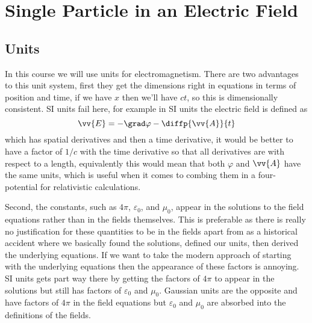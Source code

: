 \documentclass[fleqn]{NotesClass}
\begin{document}
    \chapter{Single Particle in an Electric Field}
    \section{Units}
    In this course we will use  units for electromagnetism.
    There are two advantages to this unit system, first they get the dimensions right in equations in terms of position and time, if we have \(x\) then we'll have \(ct\), so this is dimensionally consistent.
    SI units fail here, for example in SI units the electric field is defined as
    \begin{equation}
        \vv{E} = -\grad\varphi - \diffp{\vv{A}}{t}
    \end{equation}
    which has spatial derivatives and then a time derivative, it would be better to have a factor of \(1/c\) with the time derivative so that all derivatives are with respect to a length, equivalently this would mean that both \(\varphi\) and \(\vv{A}\) have the same units, which is useful when it comes to combing them in a four-potential for relativistic calculations.
    
    Second, the constants, such as \(4\pi\), \(\varepsilon_0\), and \(\mu_0\), appear in the solutions to the field equations rather than in the fields themselves.
    This is preferable as there is really no justification for these quantities to be in the fields apart from as a historical accident where we basically found the solutions, defined our units, then derived the underlying equations.
    If we want to take the modern approach of starting with the underlying equations then the appearance of these factors is annoying.
    SI units gets part way there by getting the factors of \(4\pi\) to appear in the solutions but still has factors of \(\varepsilon_0\) and \(\mu_0\).
    Gaussian units are the opposite and have factors of \(4\pi\) in the field equations but \(\varepsilon_0\) and \(\mu_0\) are absorbed into the definitions of the fields.
    
\end{document}
